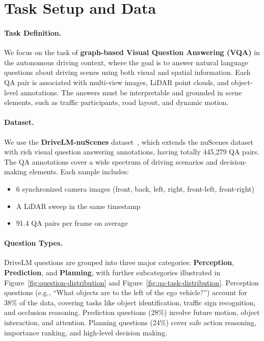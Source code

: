 \documentclass{article} %
\begin{document}
\clearpage
\section{ Task Setup and Data}
\paragraph{Task Definition.}
We focus on the task of \textbf{graph-based Visual Question Answering (VQA)} in the autonomous driving context, where the goal is to answer natural language questions about driving scenes using both visual and spatial information. Each QA pair is associated with multi-view images, LiDAR point clouds, and object-level annotations. The answers must be interpretable and grounded in scene elements, such as traffic participants, road layout, and dynamic motion.

\paragraph{Dataset.}
We use the \textbf{DriveLM-nuScenes} dataset~\cite{sima2025drivelmdrivinggraphvisual}, which extends the nuScenes dataset with rich visual question answering annotations, having totally 445,279 QA pairs. The QA annotations cover a wide spectrum of driving scenarios and decision-making elements. Each sample includes:
\begin{itemize}
    \item 6 synchronized camera images (front, back, left, right, front-left, front-right)
    \item A LiDAR sweep in the same timestamp
    \item 91.4 QA pairs per frame on average
\end{itemize}

\paragraph{Question Types.}
DriveLM questions are grouped into three major categories: \textbf{Perception}, \textbf{Prediction}, and \textbf{Planning}, with further subcategories illustrated in Figure~\ref{fig:question-distribution} and Figure~\ref{fig:qa-task-distribution}. Perception questions (e.g., “What objects are to the left of the ego vehicle?”) account for 38\% of the data, covering tasks like object identification, traffic sign recognition, and occlusion reasoning. Prediction questions (28\%) involve future motion, object interaction, and attention. Planning questions (24\%) cover safe action reasoning, importance ranking, and high-level decision making.
\end{document}

